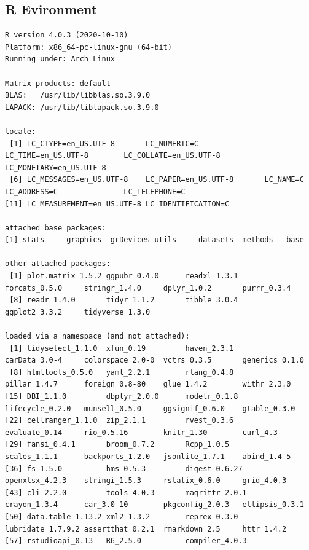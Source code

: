 \documentclass{csfourzero}
\begin{document}
\subsection{R Evironment}
\begin{verbatim}
R version 4.0.3 (2020-10-10)
Platform: x86_64-pc-linux-gnu (64-bit)
Running under: Arch Linux

Matrix products: default
BLAS:   /usr/lib/libblas.so.3.9.0
LAPACK: /usr/lib/liblapack.so.3.9.0

locale:
 [1] LC_CTYPE=en_US.UTF-8       LC_NUMERIC=C               LC_TIME=en_US.UTF-8        LC_COLLATE=en_US.UTF-8     LC_MONETARY=en_US.UTF-8   
 [6] LC_MESSAGES=en_US.UTF-8    LC_PAPER=en_US.UTF-8       LC_NAME=C                  LC_ADDRESS=C               LC_TELEPHONE=C            
[11] LC_MEASUREMENT=en_US.UTF-8 LC_IDENTIFICATION=C       

attached base packages:
[1] stats     graphics  grDevices utils     datasets  methods   base     

other attached packages:
 [1] plot.matrix_1.5.2 ggpubr_0.4.0      readxl_1.3.1      forcats_0.5.0     stringr_1.4.0     dplyr_1.0.2       purrr_0.3.4      
 [8] readr_1.4.0       tidyr_1.1.2       tibble_3.0.4      ggplot2_3.3.2     tidyverse_1.3.0  

loaded via a namespace (and not attached):
 [1] tidyselect_1.1.0  xfun_0.19         haven_2.3.1       carData_3.0-4     colorspace_2.0-0  vctrs_0.3.5       generics_0.1.0   
 [8] htmltools_0.5.0   yaml_2.2.1        rlang_0.4.8       pillar_1.4.7      foreign_0.8-80    glue_1.4.2        withr_2.3.0      
[15] DBI_1.1.0         dbplyr_2.0.0      modelr_0.1.8      lifecycle_0.2.0   munsell_0.5.0     ggsignif_0.6.0    gtable_0.3.0     
[22] cellranger_1.1.0  zip_2.1.1         rvest_0.3.6       evaluate_0.14     rio_0.5.16        knitr_1.30        curl_4.3         
[29] fansi_0.4.1       broom_0.7.2       Rcpp_1.0.5        scales_1.1.1      backports_1.2.0   jsonlite_1.7.1    abind_1.4-5      
[36] fs_1.5.0          hms_0.5.3         digest_0.6.27     openxlsx_4.2.3    stringi_1.5.3     rstatix_0.6.0     grid_4.0.3       
[43] cli_2.2.0         tools_4.0.3       magrittr_2.0.1    crayon_1.3.4      car_3.0-10        pkgconfig_2.0.3   ellipsis_0.3.1   
[50] data.table_1.13.2 xml2_1.3.2        reprex_0.3.0      lubridate_1.7.9.2 assertthat_0.2.1  rmarkdown_2.5     httr_1.4.2       
[57] rstudioapi_0.13   R6_2.5.0          compiler_4.0.3   
\end{verbatim}
\end{document}
